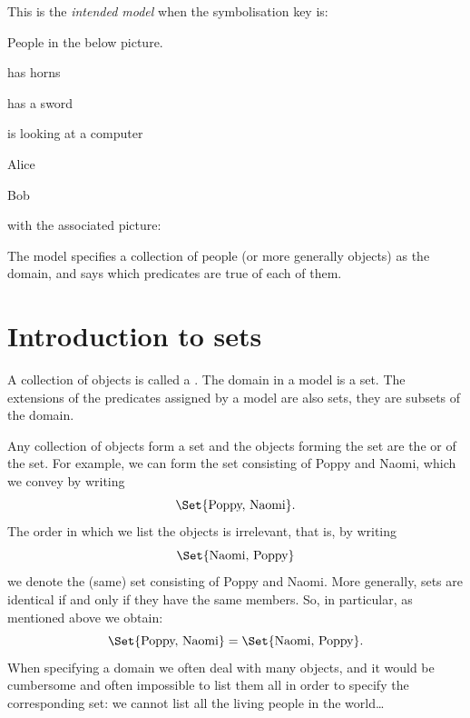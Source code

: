 This is the \emph{intended model} when the symbolisation key is:
\begin{ekey}
	\item[\text{Domain}] People in the below picture.
	\item[Hx]  has horns
	\item[Sx]  has a sword
	\item[Cx] is looking at a computer
	\item[a] Alice
	\item[b] Bob
\end{ekey}
with the associated picture:
\begin{center}
\end{center}

The model specifies a collection of people (or more generally objects) as the domain, and says which predicates are true of each of them. 



\section{Introduction to sets}
A collection of objects is called a . The domain in a model is a set. The extensions of the predicates assigned by a model are also sets, they are subsets of the domain. 


Any collection of objects form a set and the objects forming the set are the  or  of the set. For example, we can form the set consisting of Poppy and Naomi, which we convey by writing
$$\Set{\text{Poppy, Naomi}}.$$
The order in which we list the objects is irrelevant, that is, by writing
$$\Set{\text{Naomi, Poppy}}$$
we denote the (same) set consisting of Poppy and Naomi. More generally, sets are identical if and only if they have the same members. So, in particular, as mentioned above we obtain:
$$\Set{\text{Poppy, Naomi}}=\Set{\text{Naomi, Poppy}}.$$  
When specifying a domain we often deal with many objects, and it would be cumbersome and often impossible to list them all in order to specify the corresponding set: we cannot list all the living people in the world\ldots

